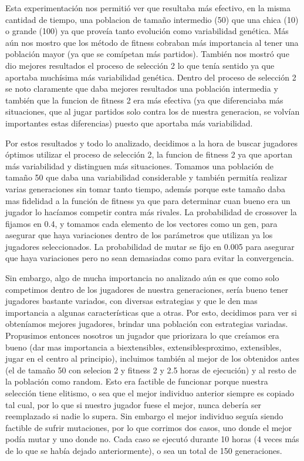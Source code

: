 \documentclass[A4paper,oneside,fleqn,11pt]{article}
\theoremstyle{definition}
\begin{document}
Esta experimentación nos permitió ver que resultaba más efectivo, en la misma cantidad de tiempo, una poblacion de tamaño intermedio (50) que una chica (10) o grande (100) ya que proveía tanto evolución como variabilidad genética. Más aún nos mostro que los método de fitness cobraban más importancia al tener una población mayor (ya que se comípetan más partidos). También nos mostró que dio mejores resultados el proceso de selección 2 lo que tenía sentido ya que aportaba muchísima más variabilidad genética. Dentro del proceso de selección 2 se noto claramente que daba mejores resultados una población intermedia y también que la funcion de fitness 2 era más efectiva (ya que diferenciaba más situaciones, que al jugar partidos solo contra los de nuestra generacion, se volvían importantes estas diferencias) puesto que aportaba más variabilidad.

Por estos resultados y todo lo analizado, decidimos a la hora de buscar jugadores óptimos utilizar el proceso de selección 2, la funcion de fitness 2 ya que aportan más variabilidad y distinguen más situaciones. Tomamos una población de tamaño 50 que daba una variabilidad considerable y también permitía realizar varias generaciones sin tomar tanto tiempo, además porque este tamaño daba mas fidelidad a la función de fitness ya que para determinar cuan bueno era un jugador lo hacíamos competir contra más rivales. La probabilidad de crossover la fijamos en 0.4, y tomamos cada elemento de los vectores como un gen, para asegurar que haya variaciones dentro de los parámetros que utilizan ya los jugadores seleccionados. La probabilidad de mutar se fijo en 0.005 para asegurar que haya variaciones pero no sean demasiadas como para evitar la convergencia.

Sin embargo, algo de mucha importancia no analizado aún es que como solo competimos dentro de los jugadores de nuestra generaciones, sería bueno tener jugadores bastante variados, con diversas estrategias y que le den mas importancia a algunas características que a otras. Por esto, decidimos para ver si obteníamos mejores jugadores, brindar una población con estrategias variadas. Propusimos entonces nosotros un jugador que priorizara lo que creíamos era bueno (dar mas importancia a biextensibles, extensiblesproximo, extensibles, jugar en el centro al principio), incluimos también al mejor de los obtenidos antes (el de tamaño 50 con selecion 2 y fitness 2 y 2.5 horas de ejecución) y al resto de la población como random. Esto era factible de funcionar porque nuestra selección tiene elitismo, o sea que el mejor individuo anterior siempre es copiado tal cual, por lo que si nuestro jugador fuese el mejor, nunca debería ser reemplazado si nadie lo supera. Sin embargo el mejor individuo seguía siendo factible de sufrir mutaciones, por lo que corrimos dos casos, uno donde el mejor podía mutar y uno donde no. Cada caso se ejecutó durante 10 horas (4 veces más de lo que se había dejado anteriormente), o sea un total de 150 generaciones.
\end{document}
